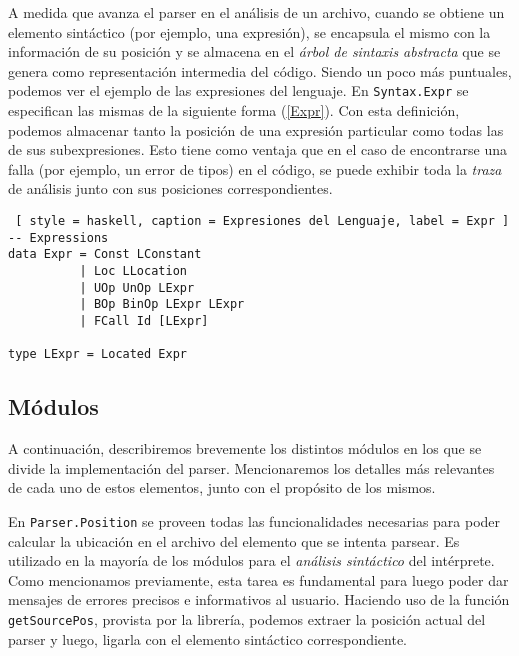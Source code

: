 A medida que avanza el parser en el análisis de un archivo, cuando se obtiene un elemento sintáctico (por ejemplo, una expresión), se encapsula el mismo con la información de su posición y se almacena en el \textit{árbol de sintaxis abstracta} que se genera como representación intermedia del código.
Siendo un poco más puntuales, podemos ver el ejemplo de las expresiones del lenguaje.
En \lstinline[style = module]{Syntax.Expr} se especifican las mismas de la siguiente forma (\ref{Expr}).
Con esta definición, podemos almacenar tanto la posición de una expresión particular como todas las de sus subexpresiones.
Esto tiene como ventaja que en el caso de encontrarse una falla (por ejemplo, un error de tipos) en el código, se puede exhibir toda la \textit{traza} de análisis junto con sus posiciones correspondientes. 

\begin{lstlisting} [ style = haskell, caption = Expresiones del Lenguaje, label = Expr ]
-- Expressions
data Expr = Const LConstant
          | Loc LLocation
          | UOp UnOp LExpr
          | BOp BinOp LExpr LExpr
          | FCall Id [LExpr]

type LExpr = Located Expr
\end{lstlisting}

\subsection{Módulos}

A continuación, describiremos brevemente los distintos módulos en los que se divide la implementación del parser.
Mencionaremos los detalles más relevantes de cada uno de estos elementos, junto con el propósito de los mismos.

En \lstinline[style = module]{Parser.Position} se proveen todas las funcionalidades necesarias para poder calcular la ubicación en el archivo del elemento que se intenta parsear.
Es utilizado en la mayoría de los módulos para el \textit{análisis sintáctico} del intérprete.
Como mencionamos previamente, esta tarea es fundamental para luego poder dar mensajes de errores precisos e informativos al usuario.
Haciendo uso de la función \lstinline[style = haskell]{getSourcePos}, provista por la librería, podemos extraer la posición actual del parser y luego, ligarla con el elemento sintáctico correspondiente.

